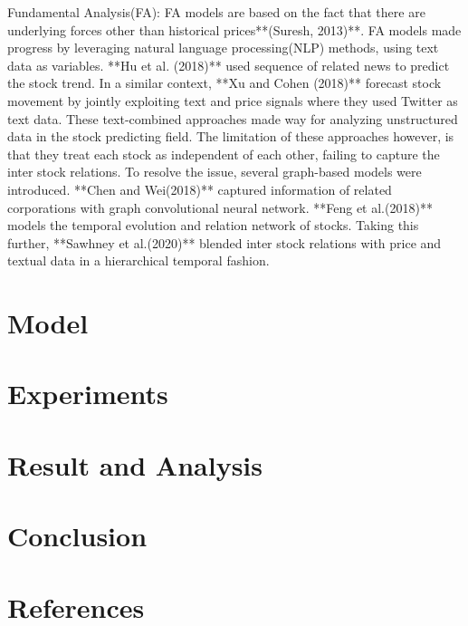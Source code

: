 \documentclass[11pt, oneside, twocolumn]{article}   	%
\begin{document}
Fundamental Analysis(FA): FA models are based on the fact that there are underlying forces other than historical prices**(Suresh, 2013)**. FA models made progress by leveraging natural language processing(NLP) methods, using text data as variables. **Hu et al. (2018)** used sequence of related news to predict the stock trend. In a similar context, **Xu and Cohen (2018)** forecast stock movement by jointly exploiting text and price signals where they used Twitter as text data. These text-combined approaches made way for analyzing unstructured data in the stock predicting field. The limitation of these approaches however, is that they treat each stock as independent of each other, failing to capture the inter stock relations. To resolve the issue, several graph-based models were introduced. **Chen and Wei(2018)** captured information of related corporations with graph convolutional neural network. **Feng et al.(2018)** models the temporal evolution and relation network of stocks. Taking this further, **Sawhney et al.(2020)** blended inter stock relations with price and textual data in a hierarchical temporal fashion.
\section{Model}
\section{Experiments}
\section{Result and Analysis}
\section{Conclusion}
\section{References}

\end{document}
